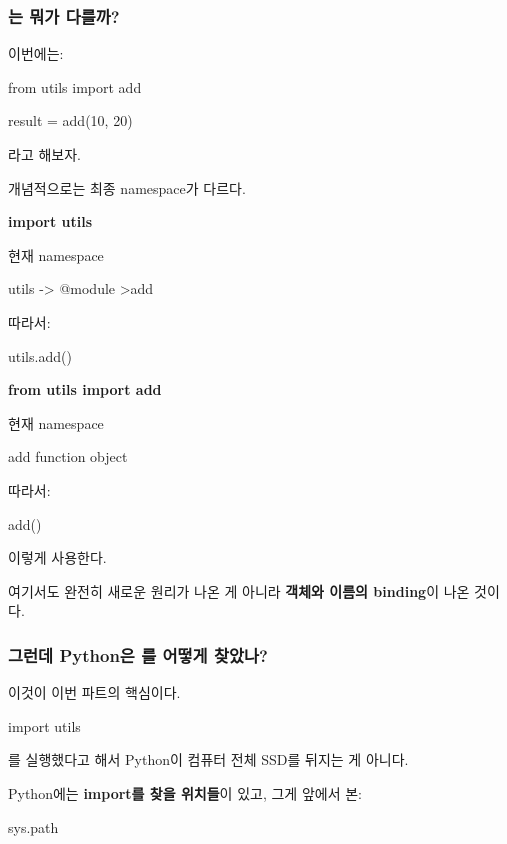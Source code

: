 \subsubsection{는 뭐가 다를까?}

이번에는:

\begin{dhkcode}
from utils import add

result = add(10, 20)
\end{dhkcode}

라고 해보자.

개념적으로는 최종 namespace가 다르다.

\textbf{import utils}

\begin{dhkdir}
현재 namespace

utils -> @module
>add
\end{dhkdir}

따라서:

\begin{dhkcode}
utils.add()
\end{dhkcode}

\textbf{from utils import add}

\begin{dhksmry}
현재 namespace

add \ra function object
\end{dhksmry}

따라서:

\begin{dhkcode}
add()
\end{dhkcode}

이렇게 사용한다.

여기서도 완전히 새로운 원리가 나온 게 아니라 \textbf{객체와 이름의 binding}이 나온 것이다.

\subsubsection{그런데 Python은 를 어떻게 찾았나?}

이것이 이번 파트의 핵심이다.

\begin{dhkcode}
import utils
\end{dhkcode}

를 실행했다고 해서 Python이 컴퓨터 전체 SSD를 뒤지는 게 아니다.

Python에는 \textbf{import를 찾을 위치들}이 있고, 그게 앞에서 본:

\begin{dhkcode}
sys.path
\end{dhkcode}

